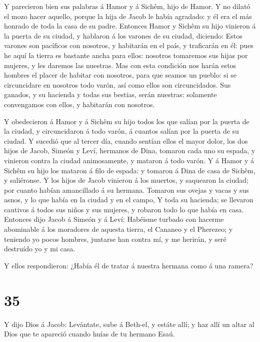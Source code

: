 Y parecieron bien sus palabras á Hamor y á Sichêm, hijo de
Hamor.  Y no dilató el mozo hacer aquello, porque la hija
de Jacob le había agradado: y él era el más honrado de toda la casa de
su padre.  Entonces Hamor y Sichêm su hijo vinieron á la
puerta de su ciudad, y hablaron á los varones de su ciudad, diciendo:
 Estos varones son pacíficos con nosotros, y habitarán en
el país, y traficarán en él: pues he aquí la tierra es bastante ancha
para ellos: nosotros tomaremos sus hijas por mujeres, y les daremos las
nuestras.  Mas con esta condición nos harán estos hombres
el placer de habitar con nosotros, para que seamos un pueblo: si se
circuncidare en nosotros todo varón, así como ellos son circuncidados.
 Sus ganados, y su hacienda y todas sus bestias, serán
nuestras: solamente convengamos con ellos, y habitarán con nosotros.

 Y obedecieron á Hamor y á Sichêm su hijo todos los que
salían por la puerta de la ciudad, y circuncidaron á todo varón, á
cuantos salían por la puerta de su ciudad.  Y sucedió que
al tercer día, cuando sentían ellos el mayor dolor, los dos hijos de
Jacob, Simeón y Leví, hermanos de Dina, tomaron cada uno su espada, y
vinieron contra la ciudad animosamente, y mataron á todo varón.
 Y á Hamor y á Sichêm su hijo los mataron á filo de espada:
y tomaron á Dina de casa de Sichêm, y saliéronse.  Y los
hijos de Jacob vinieron á los muertos, y saquearon la ciudad; por cuanto
habían amancillado á su hermana.  Tomaron sus ovejas y
vacas y sus asnos, y lo que había en la ciudad y en el campo,
 Y toda su hacienda; se llevaron cautivos á todos sus niños
y sus mujeres, y robaron todo lo que había en casa. 
Entonces dijo Jacob á Simeón y á Leví: Habéisme turbado con hacerme
abominable á los moradores de aquesta tierra, el Cananeo y el Pherezeo;
y teniendo yo pocos hombres, juntarse han contra mí, y me herirán, y
seré destruído yo y mi casa.

 Y ellos respondieron: ¿Había él de tratar á nuestra
hermana como á una ramera?

\hypertarget{section-34}{%
\section{35}\label{section-34}}

 Y dijo Dios á Jacob: Levántate, sube á Beth-el, y estáte
allí; y haz allí un altar al Dios que te apareció cuando huías de tu
hermano Esaú.

